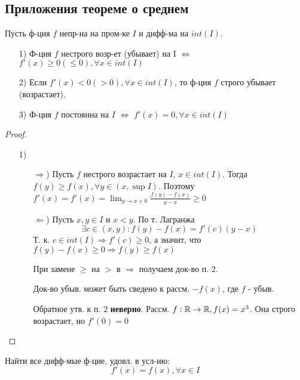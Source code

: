 \subsection{Приложения теореме о среднем}
\begin{theorem}
Пусть ф-ция $f$ непр-на на пром-ке $I$ и дифф-ма на $int(I)$.
\begin{itemize}
  \item [1) ] Ф-ция $f$ нестрого возр-ет (убывает) на I $\iff$ $f'(x) \geq 0 \left(\leq 0\right), \forall x \in int(I)$
  \item[2) ] Если $f'(x) < 0 \left(> 0\right), \forall x \in int(I)$, то ф-ция $f$ строго убывает (возрастает).
  \item [3) ] Ф-ция $f$ постоянна на $I$ $\iff$ $f'(x) = 0, \forall x \in int(I)$
\end{itemize}
\end{theorem}
\begin{proof}
\begin{itemize}
  \item [1) ] 
    \begin{itemize}
      \item [$\Rightarrow$)] Пусть $f$ нестрого возрастает на $I$, $x \in int(I)$. Тогда $f(y) \geq f(x), \forall y \in(x, \sup I)$. Поэтому $f'(x) = f'(x) = \lim_{y\to x + 0} \frac{f(y) - f(x)}{y - x} \geq 0$
      \item [$\Leftarrow$)] Пусть $x, y \in I $ и $x < y$. По т. Лагранжа
        \[
          \exists c \in (x, y) \colon f(y) - f(x) = f'(c) (y - x)
        \]
        Т. к. $c \in int(I) \Rightarrow f'(c) \geq 0$, а значит, что $f(y) - f(x) \geq 0 \Rightarrow f(y) \geq f(x)$
        \begin{note}
        При замене $\geq$ на $>$ в $\Rightarrow$ получаем док-во п. 2.
        \end{note}
        \begin{note}
        Док-во убыв. может быть сведено к рассм. $-f(x)$, где $f$ - убыв.
        \end{note}
        \begin{note}
        Обратное утв. к п. 2 \textbf{неверно}. Рассм. $f: \mathbb{R} \rightarrow \mathbb{R}, f(x) = x^{3}$. Она строго возрастает, но $f'(0) = 0$
        \end{note}
    \end{itemize}
\end{itemize}
\end{proof}
\begin{example}
Найти все дифф-мые ф-цие, удовл. в усл-ию:
\[
f'(x) = f(x), \forall x \in I
\]
\end{example}
